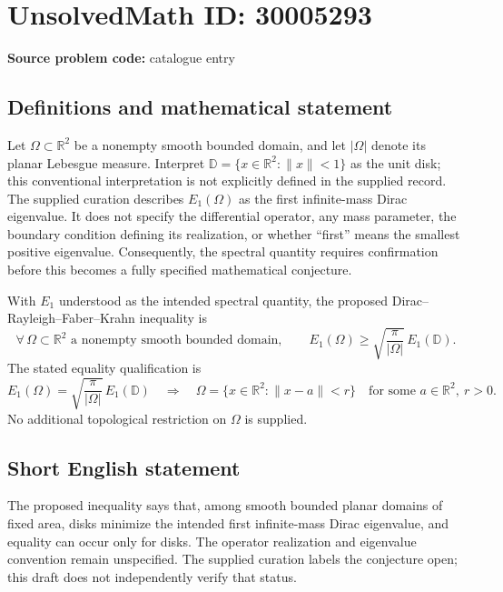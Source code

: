 \documentclass[11pt]{article}
\newcommand{\R}{\mathbb{R}}
\begin{document}
\section*{UnsolvedMath ID: 30005293}
\textbf{Source problem code:} catalogue entry
\subsection{Definitions and mathematical statement}
Let \(\Omega\subset\R^2\) be a nonempty smooth bounded domain, and let \(|\Omega|\) denote its planar Lebesgue measure. Interpret \(\mathbb D=\{x\in\R^2:\lVert x\rVert<1\}\) as the unit disk; this conventional interpretation is not explicitly defined in the supplied record. The supplied curation describes \(E_1(\Omega)\) as the first infinite-mass Dirac eigenvalue. It does not specify the differential operator, any mass parameter, the boundary condition defining its realization, or whether ``first'' means the smallest positive eigenvalue. Consequently, the spectral quantity requires confirmation before this becomes a fully specified mathematical conjecture.

With \(E_1\) understood as the intended spectral quantity, the proposed Dirac--Rayleigh--Faber--Krahn inequality is
\[
\forall\,\Omega\subset\R^2\text{ a nonempty smooth bounded domain},\qquad
E_1(\Omega)\geq \sqrt{\frac{\pi}{|\Omega|}}\,E_1(\mathbb D).
\]
The stated equality qualification is
\[
E_1(\Omega)=\sqrt{\frac{\pi}{|\Omega|}}\,E_1(\mathbb D)
\quad\Longrightarrow\quad
\Omega=\{x\in\R^2:\lVert x-a\rVert<r\}
\quad\text{for some }a\in\R^2,\ r>0.
\]
No additional topological restriction on \(\Omega\) is supplied.
\subsection{Short English statement}
The proposed inequality says that, among smooth bounded planar domains of fixed area, disks minimize the intended first infinite-mass Dirac eigenvalue, and equality can occur only for disks. The operator realization and eigenvalue convention remain unspecified. The supplied curation labels the conjecture open; this draft does not independently verify that status.
\end{document}
